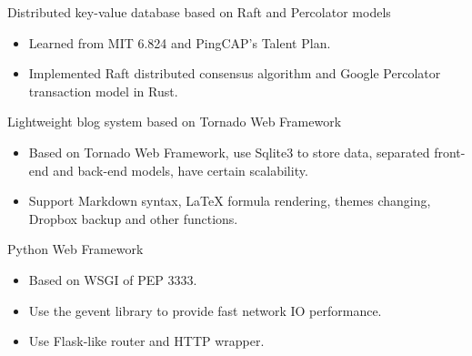 \documentclass{resume}
\newcommand{\en}[1]{#1}
\newcommand{\zh}[1]{}
\begin{document}
\en{Distributed key-value database based on Raft and Percolator models}
\zh{基于 Raft 与 Percolator 模型的分布式键值数据库}
\begin{itemize}
      \item \en{Learned from MIT 6.824 and PingCAP's Talent Plan.}
            \zh{学习 MIT 6.824 和 PingCAP Talent Plan 后完成}
      \item \en{Implemented Raft distributed consensus algorithm and Google Percolator transaction model in Rust.}
            \zh{使用 Rust 开发，基于 Raft 分布式共识算法和 Google Percolator 事务模型实现}
\end{itemize}

\en{Lightweight blog system based on Tornado Web Framework}
\zh{基于 Tornado Web Framework 的轻量级博客系统}
\begin{itemize}
      \item \en{Based on Tornado Web Framework, use Sqlite3 to store data, separated front-end and back-end models, have certain scalability.}
            \zh{基于 Tornado Web Framework 开发，使用 Sqlite3 存储数据，前后端分离，有一定扩展性}
      \item \en{Support Markdown syntax, LaTeX formula rendering, themes changing, Dropbox backup and other functions.}
            \zh{支持Markdown语法，LaTeX公式渲染，主题更换以及Dropbox备份等功能}
\end{itemize}

\en{Python Web Framework}
\zh{Python Web 框架}
\begin{itemize}
      \item \en{Based on WSGI of PEP 3333.}
            \zh{基于 PEP 3333 的 WSGI 实现}
      \item \en{Use the gevent library to provide fast network IO performance.}
            \zh{使用 gevent 库提供快速的网络 IO 表现}
      \item \en{Use Flask-like router and HTTP wrapper.}
            \zh{使用了类 Flask 的路由功能和 HTTP 封装}
\end{itemize}

\end{document}
